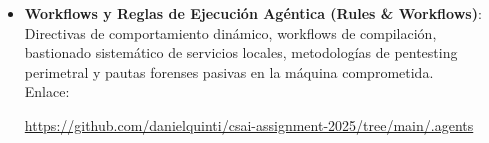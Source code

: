 \begin{itemize}
    \item \textbf{Workflows y Reglas de Ejecución Agéntica (Rules \& Workflows)}: \\
    Directivas de comportamiento dinámico, workflows de compilación, bastionado sistemático de servicios locales, metodologías de pentesting perimetral y pautas forenses pasivas en la máquina comprometida. \\
    Enlace:
    \begin{center}
        \scriptsize\url{https://github.com/danielquinti/csai-assignment-2025/tree/main/.agents}
    \end{center}
\end{itemize}


